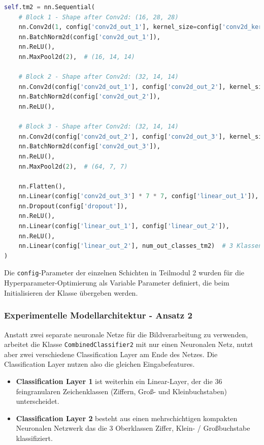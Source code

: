 \documentclass[12pt,oneside]{article}
\begin{document}
			\begin{lstlisting}[language=Python, basicstyle=\small\ttfamily]
self.tm2 = nn.Sequential(
	# Block 1 - Shape after Conv2d: (16, 28, 28)
	nn.Conv2d(1, config['conv2d_out_1'], kernel_size=config['conv2d_kernel_size_1'], stride=1, padding=padding1),  
	nn.BatchNorm2d(config['conv2d_out_1']),
	nn.ReLU(),
	nn.MaxPool2d(2),  # (16, 14, 14)
	
	# Block 2 - Shape after Conv2d: (32, 14, 14)
	nn.Conv2d(config['conv2d_out_1'], config['conv2d_out_2'], kernel_size=config['conv2d_kernel_size_2'], stride=1, padding=padding2),  
	nn.BatchNorm2d(config['conv2d_out_2']),
	nn.ReLU(),
	
	# Block 3 - Shape after Conv2d: (32, 14, 14)
	nn.Conv2d(config['conv2d_out_2'], config['conv2d_out_3'], kernel_size=config['conv2d_kernel_size_3'], stride=1, padding=padding3),  # 
	nn.BatchNorm2d(config['conv2d_out_3']),
	nn.ReLU(),
	nn.MaxPool2d(2),  # (64, 7, 7)
	
	nn.Flatten(),
	nn.Linear(config['conv2d_out_3'] * 7 * 7, config['linear_out_1']),
	nn.Dropout(config['dropout']),
	nn.ReLU(),
	nn.Linear(config['linear_out_1'], config['linear_out_2']),
	nn.ReLU(),
	nn.Linear(config['linear_out_2'], num_out_classes_tm2)  # 3 Klassen
)
			\end{lstlisting}
			
			Die \texttt{config}-Parameter der einzelnen Schichten in Teilmodul 2 wurden für die Hyper\-parameter-Optimierung als Variable Parameter definiert, die beim Initialisieren der Klasse übergeben werden.
		
		\subsubsection{Experimentelle Modellarchitektur - Ansatz 2}
			Anstatt zwei separate neuronale Netze für die Bildverarbeitung zu verwenden, arbeitet die Klasse \texttt{CombinedClassifier2} mit nur einen Neuronalen Netz, nutzt aber zwei verschiedene Classification Layer am Ende des Netzes. Die Classification Layer nutzen also die gleichen Eingabefeatures. 
			\begin{itemize}
				\item \textbf{Classification Layer 1} 
				ist weiterhin ein Linear-Layer, der die 36 feingranularen Zeichenklassen (Ziffern, Groß- und Kleinbuchstaben) unterscheidet.
				\item \textbf{Classification Layer 2}
				besteht aus einen mehrschichtigen kompakten Neuronalen Netzwerk das die 3 Oberklassen Ziffer, Klein- / Großbuchstabe klassifiziert.
			\end{itemize}
			
\end{document}
